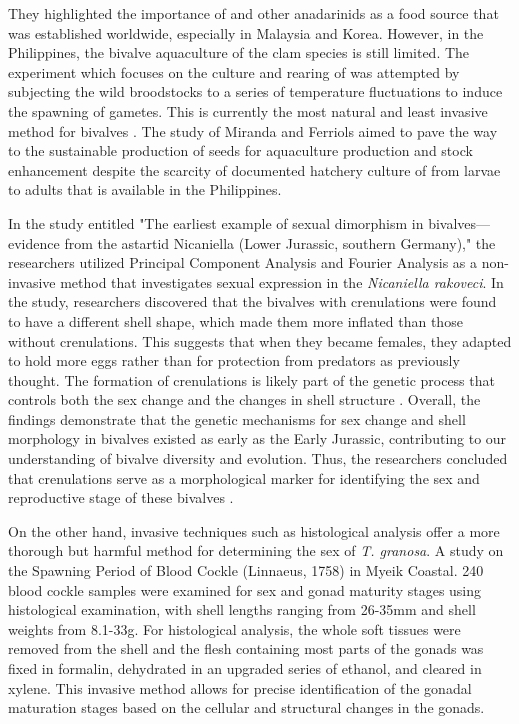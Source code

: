 They highlighted the importance of \Tgranosa and other anadarinids as a food source that was established worldwide, especially in Malaysia and Korea. However, in the Philippines, the bivalve aquaculture of the clam species is still limited. The experiment which focuses on the culture and rearing of \Tgranosa was attempted by subjecting the wild broodstocks to a series of temperature fluctuations to induce the spawning of gametes. This is currently the most natural and least invasive method for bivalves \cite{aji}. The study of Miranda and Ferriols aimed to pave the way to the sustainable production of \Tgranosa seeds for aquaculture production and stock enhancement despite the scarcity of documented hatchery culture of \Tgranosa from larvae to adults that is available in the Philippines.

In the study entitled "The earliest example of sexual dimorphism in bivalves—evidence from the astartid Nicaniella (Lower Jurassic, southern Germany)," the researchers utilized Principal Component Analysis and Fourier Analysis as a non-invasive method that investigates sexual expression in the \textit{Nicaniella rakoveci}. In the study, researchers discovered that the bivalves with crenulations were found to have a different shell shape, which made them more inflated than those without crenulations. This suggests that when they became females, they adapted to hold more eggs rather than for protection from predators as previously thought. The formation of crenulations is likely part of the genetic process that controls both the sex change and the changes in shell structure \cite{karapunar2021}. Overall, the findings demonstrate that the genetic mechanisms for sex change and shell morphology in bivalves existed as early as the Early Jurassic, contributing to our understanding of bivalve diversity and evolution. Thus, the researchers concluded that crenulations serve as a morphological marker for identifying the sex and reproductive stage of these bivalves \cite{karapunar2021}.

On the other hand, invasive techniques such as histological analysis offer a more thorough but harmful method for determining the sex of \textit{T. granosa}. A study on the Spawning Period of Blood Cockle \Tegillarcagranosa (Linnaeus, 1758) in Myeik Coastal. 240 blood cockle samples were examined for sex and gonad maturity stages using histological examination, with shell lengths ranging from 26-35mm and shell weights from 8.1-33g. For histological analysis, the whole soft tissues were removed from the shell and the flesh containing most parts of the gonads was fixed in formalin, dehydrated in an upgraded series of ethanol, and cleared in xylene. This invasive method allows for precise identification of the gonadal maturation stages based on the cellular and structural changes in the gonads.

